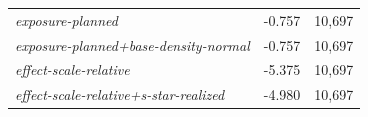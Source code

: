 \begin{tabular}{lrr}
\emph{exposure-planned} & -0.757 & 10,697 \\
\emph{exposure-planned+base-density-normal} & -0.757 & 10,697 \\
\emph{effect-scale-relative} & -5.375 & 10,697 \\
\emph{effect-scale-relative+s-star-realized} & -4.980 & 10,697 \\
\bottomrule
\end{tabular}
